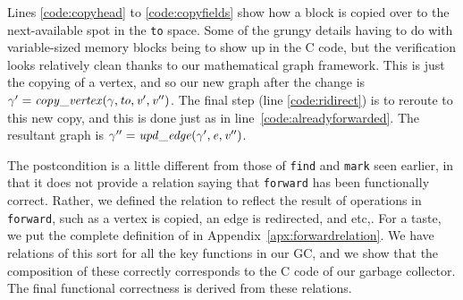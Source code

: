 \documentclass[acmsmall,review,anonymous]{acmart}\settopmatter{printfolios=true,printccs=false,printacmref=false}
\newcommand{\code}[1]{\texttt{\small #1}}
\begin{document}
Lines \ref{code:copyhead} to \ref{code:copyfields} show
how a block is copied over to the next-available spot in the 
\code{to} space. Some of the grungy details having to do with
variable-sized memory blocks being to show up in the C code,
but the verification looks relatively clean 
thanks to our mathematical graph framework.
This is just the copying of a vertex, and so our new graph after the change is
$\gamma' = \mathit{copy\_vertex}(\gamma, \mathit{to}, \mathit{v'}, \mathit{v''})$. 
The final step (line \ref{code:ridirect}) is to reroute to this 
new copy, and this is done just as in line~\ref{code:alreadyforwarded}. The
resultant graph is $\gamma'' = \mathit{upd\_edge}(\gamma', \mathit{e}, \mathit{v''})$.

The postcondition is a little different from those of \code{find}
and \code{mark} seen earlier, in that it does not provide a relation
saying that \code{forward} has been functionally correct. Rather, we
defined the relation to reflect the result of operations
in \code{forward}, such as a vertex is copied, an edge is redirected,
and etc,. For a taste, we put the complete definition
of  in Appendix~\ref{apx:forwardrelation}. We
have relations of this sort for all the key functions in our GC, and
we show that the composition of these correctly corresponds to the C
code of our garbage collector. The final functional correctness is
derived from these relations.

\newcommand{\finf}{finf}
\newcommand{\tinf}{tinf}
\newcommand{\out}{out}
\newcommand{\braces}[1]{\left\{\!\!\!\begin{array}{l@{}} #1 \end{array}\right\}}
\newcommand{\ga}{\gamma}
\newcommand{\Eg}{E_\ga}
\newcommand{\Vg}{V_\ga}
\end{document}
